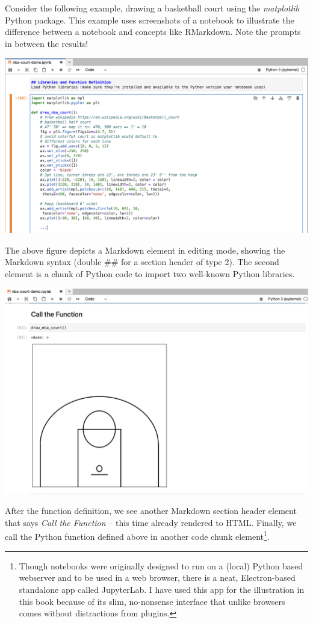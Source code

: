 \documentclass[
  12pt,
  letterpaper,
]{krantz}
\begin{document}
Consider the following example, drawing a basketball court using the
\emph{matplotlib} Python package. This example uses screenshots of a
notebook to illustrate the difference between a notebook
and concepts like RMarkdown. Note the prompts in between the results!

\includegraphics{./images/notebook-1.png}

The above figure depicts a Markdown element in editing mode, showing the
Markdown syntax (double \#\# for a section header of type 2). The second
element is a chunk of Python code to import two well-known
Python libraries.

\includegraphics{./images/notebook-2.png}

After the function definition, we see another Markdown section header
element that says \emph{Call the Function} -- this time already rendered
to HTML. Finally, we call the Python function defined
above in another code chunk element\footnote{Though
  notebooks were originally designed to run on a (local)
  Python based webserver and to be used in a web browser, there is a
  neat, Electron-based standalone app called JupyterLab.
  I have used this app for the illustration in this book because of its
  slim, no-nonsense interface that unlike browsers comes without
  distractions from plugins.}.
\end{document}
